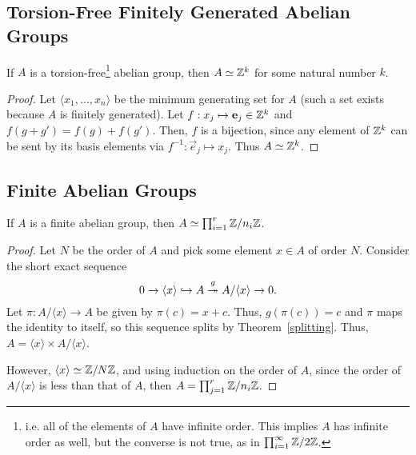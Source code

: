 \subsection{Torsion-Free Finitely Generated Abelian Groups}
\begin{thm}
\label{torsionfree}
If $A$ is a torsion-free\footnote{i.e. all of the elements of $A$ have infinite order. This implies $A$ has infinite order as well, but the converse is not true, as in $\prod_{i=1}^{\infty} \mathbb{Z}/2\mathbb{Z}$.} abelian group, then $A\simeq \mathbb{Z}^k$ for some natural number $k$.
\end{thm}
\begin{proof}
Let $\langle x_1,\dots,x_n\rangle$ be the minimum generating set for $A$ (such a set exists because $A$ is finitely generated). Let $f: x_j\mapsto\mathbf e_j\in\mathbb{Z}^k$ and $f(g+g') = f(g)+f(g')$. Then, $f$ is a bijection, since any element of $\mathbb{Z}^k$ can be sent by its basis elements via $f^{-1}:\vec e_j\mapsto x_j$. Thus $A\simeq \mathbb{Z}^k$.
\end{proof}
\subsection{Finite Abelian Groups}
\begin{thm}
If $A$ is a finite abelian group, then $A \simeq \prod_{i=1}^r \mathbb{Z}/n_i\mathbb{Z}$.
\label{finite}
\end{thm}
\begin{proof}
Let $N$ be the order of $A$ and pick some element $x\in A$ of order $N$. Consider the short exact sequence
\[0\to \langle x\rangle \hookrightarrow A \stackrel g{\twoheadrightarrow} A/\langle x \rangle \to 0.\]
Let $\pi: A/\langle x \rangle \to A$ be given by $\pi(c) = x+ c$. Thus, $g(\pi(c)) = c$ and $\pi$ maps the identity to itself, so this sequence splits by Theorem~\ref{splitting}. Thus, $A = \langle x \rangle \times A/\langle x\rangle$.

However, $\langle x \rangle \simeq \mathbb{Z}/N\mathbb{Z}$, and using induction on the order of $A$, since the order of $A/\langle x\rangle$ is less than that of $A$, then $A = \prod_{j=1}^r \mathbb{Z}/n_i\mathbb{Z}$.
\end{proof}
